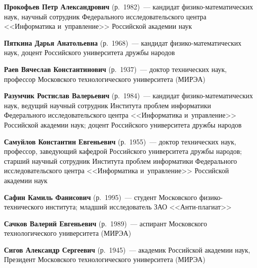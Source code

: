 \begin{multicols}{2}
\vspace*{3pt} 

\noindent
\textbf{Прокофьев Петр Александрович} (р.\ 1982)~---
кандидат фи\-зи\-ко-ма\-те\-ма\-ти\-че\-ских наук, научный сотрудник 
Федерального исследовательского центра <<Информатика и~управ\-ле\-ние>>
 Российской академии наук

\vspace*{3pt} 

\noindent
\textbf{Пяткина Дарья Анатольевна} (р.\ 1968)~---
кандидат фи\-зи\-ко-ма\-те\-ма\-ти\-че\-ских наук, доцент Российского университета дружбы народов

\vspace*{3pt} 

\noindent
\textbf{Раев Вячеслав Константинович} (р.\ 1937)~---
доктор технических наук, профессор Московского технологического университета (МИРЭА)

\columnbreak

\noindent
\textbf{Разумчик Ростислав Валерьевич} (р.\ 1984)~---
кандидат фи\-зи\-ко-ма\-те\-ма\-ти\-че\-ских наук, ведущий научный сотрудник
 Института проб\-лем информатики Федерального исследовательского центра 
 <<Информатика и~управ\-ле\-ние>> Российской академии наук; доцент Российского 
 университета дружбы народов

\vspace*{3pt} 

\noindent
\textbf{Самуйлов Константин Евгеньевич} (р.\ 1955)~---
доктор технических наук, профессор, заведующий кафедрой Российского университета
 дружбы народов; старший научный сотрудник Института \mbox{проб\-лем} 
 информатики Федерального исследовательского центра <<Информатика и~управ\-ле\-ние>> 
 Российской академии наук 

\vspace*{3pt} 

\noindent
\textbf{Сафин Камиль Фанисович} (р.\ 1995)~--- 
студент Мос\-ков\-ско\-го фи\-зи\-ко-тех\-ни\-че\-ско\-го института; 
младший исследователь ЗАО <<Анти-плагиат>> 

\vspace*{3pt} 

\noindent
\textbf{Сачков Валерий Евгеньевич} (р.\ 1989)~---
аспирант Московского технологического университета (МИРЭА)

\vspace*{3pt} 

\noindent
\textbf{Сигов Александр Сергеевич} (р.\ 1945)~---
академик Российской академии наук, 
Президент Московского технологического университета (МИРЭА) 


\end{multicols}
